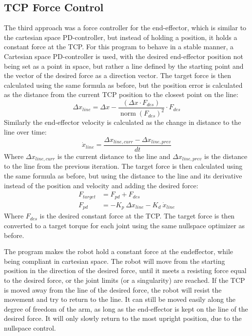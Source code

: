 \subsection{TCP Force Control}
The third approach was a force controller for the end-effector, which is similar to the cartesian space PD-controller, but instead of holding a position,
it holds a constant force at the TCP. For this program to behave in a stable manner, a Cartesian space PD-controller is used,
with the desired end-effector position not being set as a point in space, but rather a line defined by the starting point and the vector of the desired force as a direction vector.
The target force is then calculated using the same formula as before, but the position error is calculated as the distance from the current TCP position to the closest point
on the line:
\begin{equation}
    \Delta x_{line} = \Delta x - \frac{(\Delta x \cdot F_{des})}{\operatorname{norm}(F_{des})^2} \cdot F_{des}
\end{equation}
Similarly the end-effector velocity is calculated as the change in distance to the line over time:
\begin{equation}
    \dot{x}_{line} = \frac{\Delta x_{line, curr} - \Delta x_{line, prev}}{dt}
\end{equation}
Where $\Delta x_{line, curr}$ is the current distance to the line and $\Delta x_{line, prev}$ is the distance to the line from the previous iteration.
The target force is then calculated using the same formula as before, but using the distance to the line and its derivative instead of the position and velocity and adding the
desired force:
\begin{align}
    F_{target} &= F_{pd} + F_{des} \\
    F_{pd} &= - K_p \ \Delta x_{line} - K_d \ \dot{x}_{line}
\end{align}
Where $F_{des}$ is the desired constant force at the TCP.
The target force is then converted to a target torque for each joint using the same nullspace optimizer as before.

The program makes the robot hold a constant force at the endeffector, while being compliant in cartesian space. The robot will move from the starting position in the direction
of the desired force, until it meets a resisting force equal to the desired force, or the joint limits (or a singularity) are reached. If the TCP is moved away from the line
of the desired force, the robot will resist the movement and try to return to the line. It can still be moved easily along the degree of freedom of the arm, as long as the end-effector
is kept on the line of the desired force. It will only slowly return to the most upright position, due to the nullspace control.